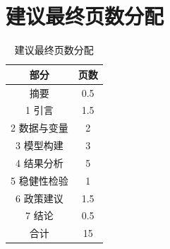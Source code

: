 \section*{建议最终页数分配}

\begin{table}[H]
\centering
\caption{建议最终页数分配}
\begin{tabular}{cc}
\toprule
\rowcolor{tablehead}
部分 & 页数 \\
\midrule
摘要 & 0.5 \\
1 引言 & 1.5 \\
2 数据与变量 & 2 \\
3 模型构建 & 3 \\
4 结果分析 & 5 \\
5 稳健性检验 & 1 \\
6 政策建议 & 1.5 \\
7 结论 & 0.5 \\
合计 & 15 \\
\bottomrule
\end{tabular}
\end{table}
